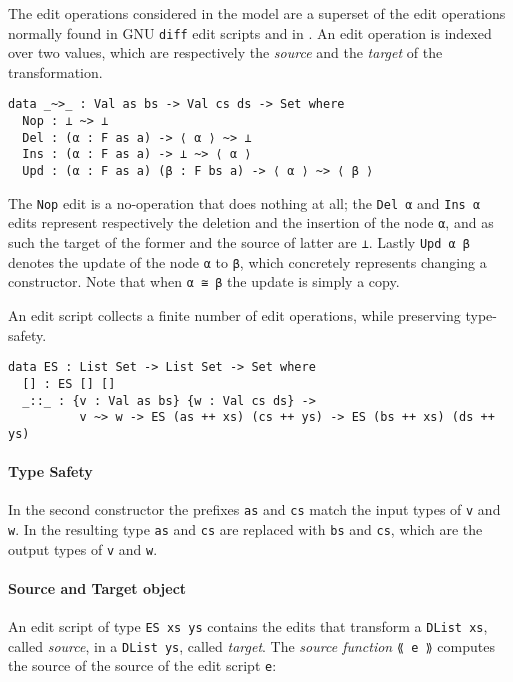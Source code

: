 \documentclass[../Thesis.tex]{subfiles}
\begin{document}
	The edit operations considered in the model are a superset of the edit
	operations normally found in GNU \texttt{diff} edit scripts and in 
	\cite{Lemp09}.
	An edit operation is indexed over two values, which are respectively
	the \emph{source} and the \emph{target} of the transformation.
	
\begin{verbatim}
data _~>_ : Val as bs -> Val cs ds -> Set where
  Nop : ⊥ ~> ⊥
  Del : (α : F as a) -> ⟨ α ⟩ ~> ⊥
  Ins : (α : F as a) -> ⊥ ~> ⟨ α ⟩
  Upd : (α : F as a) (β : F bs a) -> ⟨ α ⟩ ~> ⟨ β ⟩
\end{verbatim}
	
	The \texttt{Nop} edit is a no-operation that does nothing
	at all; the \texttt{Del α} and \texttt{Ins α} edits represent 
	respectively the deletion and the insertion of the node \texttt{α}, and as 
	such the target of the former and the source of latter are \texttt{⊥}.
	Lastly \texttt{Upd α β} denotes the update of the node \texttt{α}
	to \texttt{β}, which concretely represents changing a constructor. 
	Note that when \texttt{α ≅ β} the update is simply a copy.

	An edit script collects a finite number of edit operations, 
	while preserving type-safety.
\begin{verbatim}
data ES : List Set -> List Set -> Set where
  [] : ES [] []
  _::_ : {v : Val as bs} {w : Val cs ds} -> 
          v ~> w -> ES (as ++ xs) (cs ++ ys) -> ES (bs ++ xs) (ds ++ ys)
\end{verbatim}

	\paragraph{Type Safety}
	In the second constructor the prefixes \texttt{as} and \texttt{cs} match
	the input types of \texttt{v} and \texttt{w}.
	In the resulting type \texttt{as} and \texttt{cs} are replaced with
	\texttt{bs} and \texttt{cs}, which are the output types of 
	\texttt{v} and \texttt{w}.
	
	\paragraph{Source and Target object}
	\label{par:SourceTargetObj}
	An edit script of type \texttt{ES xs ys} contains the edits
	that transform a \texttt{DList xs}, called \emph{source}, 
	in a \texttt{DList ys}, called \emph{target}. 
	The \emph{source function} \texttt{⟪ e ⟫} computes
	the source of the source of the edit script \texttt{e}:
		
\end{document}
